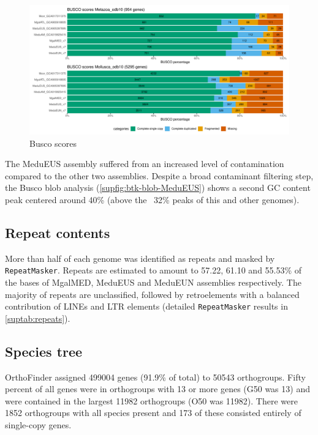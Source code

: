 \documentclass[11pt, a4paper]{article}
\begin{document}
\begin{figure}[h]
	\includegraphics[width=\linewidth]{figures/Fig2_busco.pdf}
	\caption{Busco scores}
	\label{fig:busco}
\end{figure}

The MeduEUS assembly suffered from an increased level of contamination compared to the other two assemblies.
Despite a broad contaminant filtering step, the Busco blob analysis (\cref{supfig:btk-blob-MeduEUS})
shows a second GC content peak centered around 40\% (above the ~32\% peaks of this and other genomes).

\subsection{Repeat contents}

More than half of each genome was identified as repeats and masked by \texttt{RepeatMasker}.
Repeats are estimated to amount to 57.22, 61.10 and 55.53\% of the bases of MgalMED, MeduEUS and MeduEUN assemblies respectively.
The majority of repeats are unclassified, followed by retroelements with a balanced contribution of LINEs and LTR elements
(detailed \texttt{RepeatMasker} results in \cref{suptab:repeats}).

%

\subsection{Species tree}

OrthoFinder assigned 499004 genes (91.9\% of total) to 50543 orthogroups. Fifty percent of all 
genes were in orthogroups with 13 or more genes (G50 was 13) and were contained in the largest
11982 orthogroups (O50 was 11982). There were 1852 orthogroups with all species present and 
173 of these consisted entirely of single-copy genes.
\end{document}
